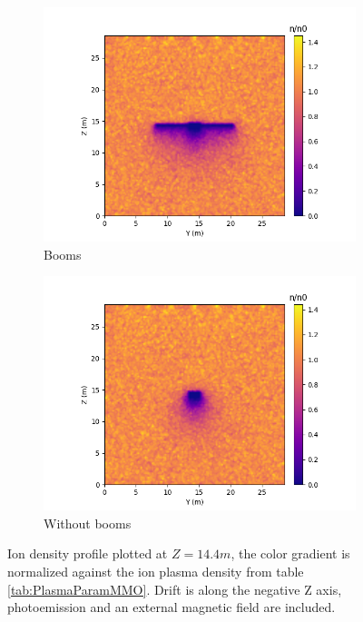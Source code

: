 \begin{figure}[H]
  \begin{subfigure}[b]{0.6\textwidth}
  \includegraphics[width=\textwidth]{figures/MMO/BField/WB/I_BField_WB.png}
  \caption{Booms}
  \label{fig:I_BField_WB}
\end{subfigure}
\begin{subfigure}[b]{0.6\textwidth}
  \includegraphics[width=\textwidth]{figures/MMO/BField/NB/I_BField_NB.png}
  \caption{Without booms}
  \label{fig:I_BField_NB}
\end{subfigure}
\label{fig:Ions_BField}
\caption{Ion density profile plotted at $Z = 14.4 m$, the color gradient is normalized against the ion plasma density from table \ref{tab:PlasmaParamMMO}. Drift is along the negative Z axis, photoemission and an external magnetic field are included.}
\end{figure}

